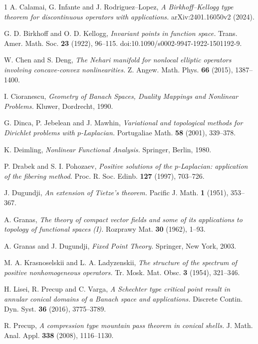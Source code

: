 \documentclass{birkjour}
\theoremstyle{definition}
\theoremstyle{remark}
\numberwithin{equation}{section}
\begin{document}
\begin{thebibliography}{1}
 A. Calamai, G. Infante and J. Rodriguez--Lopez,
\textit{A Birkhoff--Kellogg type theorem for discontinuous operators with applications.}
arXiv:2401.16050v2 (2024).

 G. D. Birkhoff and O. D. Kellogg,
\textit{Invariant points in function space.}
Trans. Amer. Math. Soc. \textbf{23} (1922), 96--115.
doi:10.1090/s0002-9947-1922-1501192-9.

 W. Chen and S. Deng,
\textit{The Nehari manifold for nonlocal elliptic operators involving concave-convex nonlinearities.}
Z. Angew. Math. Phys. \textbf{66} (2015), 1387--1400.

 I. Cioranescu,
\textit{Geometry of Banach Spaces, Duality Mappings and Nonlinear Problems.}
Kluwer, Dordrecht, 1990.

 G. Dinca, P. Jebelean and J. Mawhin,
\textit{Variational and topological methods for Dirichlet problems with $p$-Laplacian.}
Portugaliae Math. \textbf{58} (2001), 339--378.

 K. Deimling,
\textit{Nonlinear Functional Analysis.}
Springer, Berlin, 1980.

 P. Drabek and S. I. Pohozaev,
\textit{Positive solutions of the $p$-Laplacian: application of the fibering method.}
Proc. R. Soc. Edinb. \textbf{127} (1997), 703--726.

 J. Dugundji,
\textit{An extension of Tietze's theorem.}
Pacific J. Math. \textbf{1} (1951), 353--367.

 A. Granas,
\textit{The theory of compact vector fields and some of its applications to topology of functional spaces (I).}
Rozprawy Mat. \textbf{30} (1962), 1--93.

 A. Granas and J. Dugundji,
\textit{Fixed Point Theory.}
Springer, New York, 2003.

 M. A. Krasnoselskii and L. A. Ladyzenskii,
\textit{The structure of the spectrum of positive nonhomogeneous operators.}
Tr. Mosk. Mat. Obsc. \textbf{3} (1954), 321--346.

 H. Lisei, R. Precup and C. Varga,
\textit{A Schechter type critical point result in annular conical domains of a Banach space and applications.}
Discrete Contin. Dyn. Syst. \textbf{36} (2016), 3775--3789.

 R. Precup,
\textit{A compression type mountain pass theorem in conical shells.}
J. Math. Anal. Appl. \textbf{338} (2008), 1116--1130.


\end{thebibliography}
\end{document}

